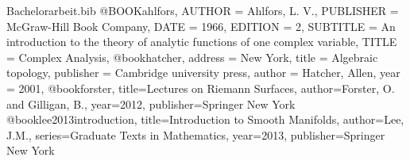 	\begin{filecontents}[overwrite]{Bachelorarbeit.bib}
		@BOOK{ahlfors,
			AUTHOR = {Ahlfors, L. V.},
			PUBLISHER = {McGraw-Hill Book Company},
			DATE = {1966},
			EDITION = {2},
			SUBTITLE = {An introduction to the theory of analytic functions of one complex variable},
			TITLE = {Complex Analysis},
		}
		@book{hatcher,
			address = {New York},
			title = {Algebraic topology},
			publisher = {Cambridge university press},
			author = {Hatcher, Allen},
			year = {2001},
		}
		@book{forster,
  			title={Lectures on Riemann Surfaces},
  			author={Forster, O. and Gilligan, B.},
			year={2012},
			publisher={Springer New York}
		}
		@book{lee2013introduction,
			title={Introduction to Smooth Manifolds},
			author={Lee, J.M.},
			series={Graduate Texts in Mathematics},
			year={2013},
			publisher={Springer New York}
		}
	\end{filecontents}
	
\usepackage{wrapfig}
\usepackage{scalerel}
\usepackage{stackengine,wasysym}
	\newcommand\reallywidetilde[1]{\ThisStyle{%
	\setbox0=\hbox{$\SavedStyle#1$}%
	\stackengine{-.1\LMpt}{$\SavedStyle#1$}{%
		\stretchto{\scaleto{\SavedStyle\mkern.2mu\AC}{.5150\wd0}}{.6\ht0}%
	}{O}{c}{F}{T}{S}%
	}}


\newcommand*{\nsection}[1]{
    \section*{#1}
    \addcontentsline{toc}{section}{#1}
}
\newcommand*{\nsubsection}[1]{
    \subsection*{#1}
    \addcontentsline{toc}{subsection}{#1}
}
\renewcommand{\subset}{\subseteq}
\newcommand{\N}{\mathbb{N}}
\newcommand{\Z}{\mathbb{Z}}
\newcommand{\Q}{\mathbb{Q}}
\newcommand{\R}{\mathbb{R}}
\newcommand{\C}{\mathbb{C}}
\newcommand*{\simsym}{\mathord\sim}
\newcommand{\mymarginpar}[1]{\marginpar{\tiny #1}}
\DeclareMathOperator{\Hom}{Hom}
\DeclareMathOperator{\End}{End}
\DeclareMathOperator{\id}{id}
\DeclareMathOperator{\ev}{ev}
\DeclareMathOperator{\Image}{Im}
\NewCommandCopy{\ordinaryforall}{\forall}
\NewCommandCopy{\ordinaryexists}{\exists}
\RenewDocumentCommand{\forall}{}{\mathop{{}\ordinaryforall}}
\RenewDocumentCommand{\exists}{}{\mathop{{}\ordinaryexists}}
\NewDocumentCommand{\existsunique}{}{\mathop{\ordinaryexists!}}
\newcommand{\norm}[1]{\left\lvert#1\right\rvert}
\newcommand{\Norm}[1]{\left\lVert#1\right\rVert}
\newcommand{
	\explainabove
}[2]{
	\overset{
	 	\mathclap{
			\tikz 
				\node [gray] {$\downarrow$} 
					node [above=0.5ex, gray, font=\tiny] {#1};
		}
	}{#2}
}
\newcommand{
	\explainbelow
}[2]{
       	 \underset{
	 	\mathclap{
			\tikz 
				\node [gray] {$\uparrow$} 
					node [below=0.5ex, gray, font=\tiny] {#1};
		}
	}{#2}
}

\newcommand{
	\explainabovebelow
}[3]{
	\explainabove{#1}{\explainbelow{#2}{#3}}
}
\newcommand{\arrow}{\rightarrow}
\newcommand{\longarrow}{\longrightarrow}
\setlength{\parindent}{0pt}
